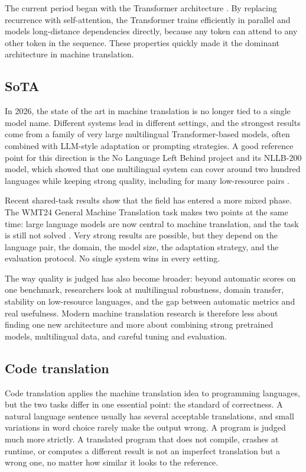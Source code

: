 The current period began with the Transformer architecture
\cite{vaswani2017transformer}. By replacing recurrence with self-attention,
the Transformer trains efficiently in parallel and models long-distance
dependencies directly, because any token can attend to any other token in the
sequence. These properties quickly made it the dominant architecture in
machine translation.

\subsection{SoTA}

\quad In 2026, the state of the art in machine translation is no longer tied
to a single model name. Different systems lead in different settings, and the
strongest results come from a family of very large multilingual
Transformer-based models, often combined with LLM-style adaptation or
prompting strategies. A good reference point for this direction is the No
Language Left Behind project and its NLLB-200 model, which showed that one
multilingual system can cover around two hundred languages while keeping
strong quality, including for many low-resource pairs \cite{team2024nllb}.

Recent shared-task results show that the field has entered a more mixed phase.
The WMT24 General Machine Translation task makes two points at the same time:
large language models are now central to machine translation, and the task is
still not solved \cite{wmt24general}. Very strong results are possible, but
they depend on the language pair, the domain, the model size, the adaptation
strategy, and the evaluation protocol. No single system wins in every setting.

The way quality is judged has also become broader: beyond automatic scores on
one benchmark, researchers look at multilingual robustness, domain transfer,
stability on low-resource languages, and the gap between automatic metrics and
real usefulness. Modern machine translation research is therefore less about
finding one new architecture and more about combining strong pretrained
models, multilingual data, and careful tuning and evaluation.

\subsection{Code translation}

\quad Code translation applies the machine translation idea to programming
languages, but the two tasks differ in one essential point: the standard of
correctness. A natural language sentence usually has several acceptable
translations, and small variations in word choice rarely make the output
wrong. A program is judged much more strictly. A translated program that does
not compile, crashes at runtime, or computes a different result is not an
imperfect translation but a wrong one, no matter how similar it looks to the
reference.

